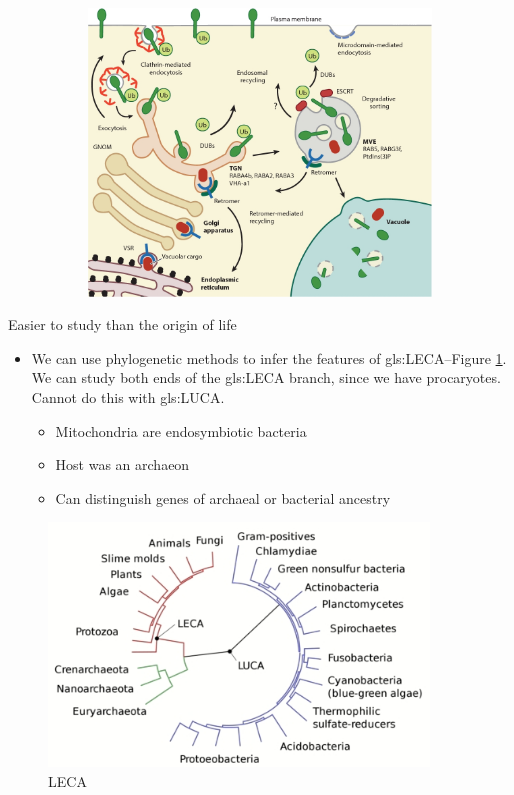 \documentclass[]{article}
\begin{document}
\begin{figure}[H]
\begin{subfigure}[b]{0.45\textwidth}
	\includegraphics[width=\textwidth]{Regulation2}
	\end{subfigure}
\end{figure}
Easier to study than the
origin of life

\begin{itemize}
	\item We can use phylogenetic methods to infer the features of \gls{gls:LECA}--Figure \ref {fig:LECA}. We can study both ends of the \gls{gls:LECA} branch, since we have procaryotes. Cannot do this with \gls{gls:LUCA}.
	\begin{itemize}
		\item Mitochondria are endosymbiotic bacteria\cite{germot1996presence}
		\item Host was an archaeon\cite{spang2015complex}
		\item Can distinguish genes of archaeal or
		bacterial ancestry\cite{thiergart2012evolutionary}
	\end{itemize}
\end{itemize}

\begin{figure}[H]
	\caption{LECA}\label{fig:LECA}
	\includegraphics[width=0.9\textwidth]{LECA}
\end{figure}
\end{document}
